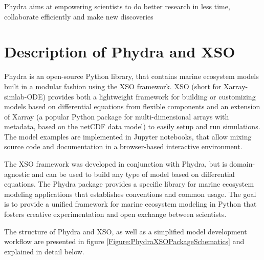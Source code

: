 \documentclass[journal abbreviation, manuscript]{copernicus}
\begin{document}
Phydra aims at empowering scientists to do better research in less time, collaborate efficiently and make new discoveries






\section{Description of Phydra and XSO} \label{Section:phydrapackage}

Phydra is an open-source Python library, that contains marine ecosystem models built in a modular fashion using the XSO framework. XSO (short for Xarray-simlab-ODE) provides both a lightweight framework for building or customizing models based on differential equations from flexible components and an extension of Xarray (a popular Python package for multi-dimensional arrays with metadata, based on the netCDF data model) to easily setup and run simulations. The model examples are implemented in Jupyter notebooks, that allow mixing source code and documentation in a browser-based interactive environment. 

The XSO framework was developed in conjunction with Phydra, but is domain-agnostic and can be used to build any type of model based on differential equations. The Phydra package provides a specific library for marine ecosystem modeling applications that establishes conventions and common usage. The goal is to provide a unified framework for marine ecosystem modeling in Python that fosters creative experimentation and open exchange between scientists.

The structure of Phydra and XSO, as well as a simplified model development workflow are presented in figure \ref{Figure:PhydraXSOPackageSchematics} and explained in detail below.
\end{document}
